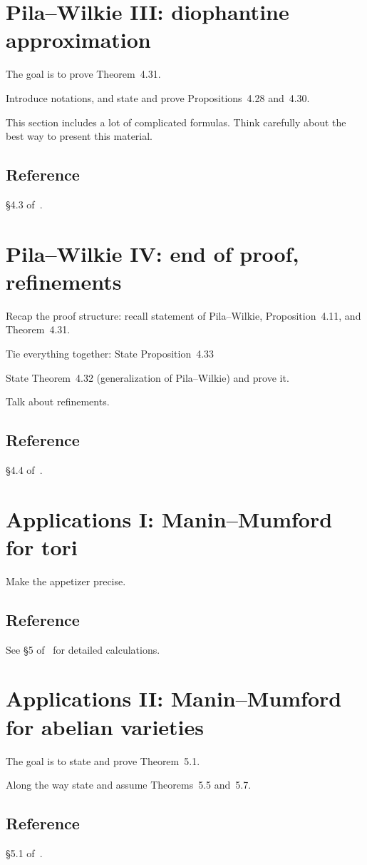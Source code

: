 \documentclass[10pt, a4paper]{amsart}
\begin{document}
\section{Pila--Wilkie III: diophantine approximation}

The goal is to prove Theorem~4.31.

Introduce notations,
and state and prove Propositions~4.28 and~4.30.

This section includes a lot of complicated formulas.
Think carefully about the best way to present this material.

\subsection*{Reference} \S4.3 of~\cite{scanlon}.

\section{Pila--Wilkie IV: end of proof, refinements}

Recap the proof structure:
recall statement of Pila--Wilkie, Proposition~4.11, and Theorem~4.31.

Tie everything together: State Proposition~4.33

State Theorem~4.32 (generalization of Pila--Wilkie) and prove it.

Talk about refinements.

\subsection*{Reference} \S4.4 of~\cite{scanlon}.

\section{Applications I: Manin--Mumford for tori}

Make the appetizer precise.

\subsection*{Reference}
See \S5 of~\cite{csp} for detailed calculations.

\section{Applications II: Manin--Mumford for abelian varieties}

The goal is to state and prove Theorem~5.1.

Along the way state and assume Theorems~5.5 and~5.7.

\subsection*{Reference} \S5.1 of~\cite{scanlon}.

\printbibliography
\end{document}
